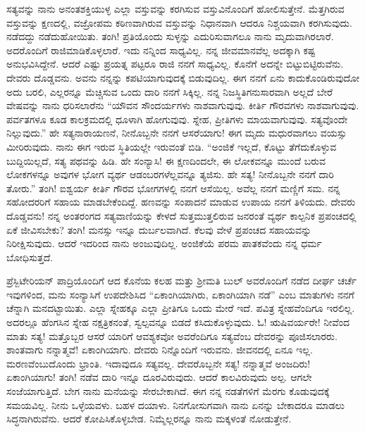 ಸತ್ಯವನ್ನು ನಾನು ಅನಂತಶಕ್ತಿಯುಳ್ಳ ಎಲ್ಲಾ ವಸ್ತುವನ್ನು ಕರಗಿಸುವ ವಸ್ತುವಿನೊಂದಿಗೆ ಹೋಲಿಸುತ್ತೇನೆ. ಮೆತ್ತಗಿರುವ ವಸ್ತುವನ್ನು ಕ್ಷಣದಲ್ಲಿ, ವಜ್ರೋಪಮ ಕಠಿಣವಾಗಿರುವ ವಸ್ತುವನ್ನು ನಿಧಾನವಾಗಿ ಆದರೂ ನಿಶ್ಚಯವಾಗಿ ಕರಗಿಸುವುದು. ನಡೆದದ್ದು ನಡೆದುಹೋಯಿತು. ತಂಗಿ! ಪ್ರತಿಯೊಂದು ಸುಳ್ಳನ್ನು ಎದುರಿಸುವಾಗಲೂ ನಾನು ಮೃದುವಾಗಿರಲಾರೆ. ಅದರೊಂದಿಗೆ ರಾಜಿಮಾಡಿಕೊಳ್ಳಲಾರೆ. ಇದು ನನ್ನಿಂದ ಸಾಧ್ಯವಿಲ್ಲ. ನನ್ನ ಜೀವಮಾನವೆಲ್ಲ ಅದಕ್ಕಾಗಿ ಕಷ್ಟ ಅನುಭವಿಸಿದ್ದೇನೆ. ಆದರೆ ಎಷ್ಟು ಪ್ರಯತ್ನ ಪಟ್ಟರೂ ರಾಜಿ ನನಗೆ ಸಾಧ್ಯವಿಲ್ಲ. ಕೊನೆಗೆ ಅದನ್ನೇ ಬಿಟ್ಟುಬಿಟ್ಟಿರುವೆನು. ದೇವರು ದೊಡ್ಡವನು. ಅವನು ನನ್ನನ್ನು ಕಪಟಿಯಾಗುವುದಕ್ಕೆ ಬಿಡುವುದಿಲ್ಲ. ಈಗ ನನಗೆ ಏನು ಕಾದುಕೊಂಡಿರುವುದೋ ಅದು ಬರಲಿ, ಎಲ್ಲರನ್ನೂ ಮೆಚ್ಚಿಸುವ ಒಂದು ದಾರಿ ನನಗೆ ಸಿಕ್ಕಿಲ್ಲ. ನನ್ನ ನಿಜಸ್ಥಿತಿಗನುಸಾರವಾಗಿ ಅಲ್ಲದೆ ಬೇರೆ ವೇಷವನ್ನು ನಾನು ಧರಿಸಲಾರೆನು ``ಯೌವನ ಸೌಂದರ್ಯಗಳು ನಾಶವಾಗುವುವು. ಕೀರ್ತಿ ಗೌರವಗಳು ನಾಶವಾಗುವುವು. ಪರ್ವತಗಳೂ ಕೂಡ ಕಾಲಕ್ರಮದಲ್ಲಿ ಧೂಳಾಗಿ ಹೋಗುವುವು. ಸ್ನೇಹ, ಪ್ರೀತಿಗಳು ಮಾಯವಾಗುವುವು. ಸತ್ಯವೊಂದೇ ನಿಲ್ಲುವುದು.” ಹೇ ಸತ್ಯನಾರಾಯಣನೆ, ನೀನೊಬ್ಬನೇ ನನಗೆ ಆಸರೆಯಾಗು! ಈಗ ಮೃದು ಮಧುರವಾಗಲು ವಯಸ್ಸು ಮೀರಿರುವುದು. ನಾನು ಈಗ ಇರುವ ಸ್ಥಿತಿಯಲ್ಲೇ ಇರುವಂತೆ ಬಿಡಿ. “ಅಂಜಿಕೆ ಇಲ್ಲದೆ, ಕೊಟ್ಟು ತೆಗೆದುಕೊಳ್ಳುವ ಬುದ್ದಿಯಿಲ್ಲದೆ, ಸತ್ಯ ಪಥವನ್ನು ಹಿಡಿ. ಹೇ ಸಂನ್ಯಾಸಿ! ಈ ಕ್ಷಣದಿಂದಲೇ, ಈ ಲೋಕವನ್ನೂ ಮುಂದೆ ಬರುವ ಲೋಕಗಳನ್ನೂ ಅವುಗಳ ಭೋಗ ವ್ಯರ್ಥ ಆಡಂಬರಗಳೆಲ್ಲವನ್ನೂ ತ್ಯಜಿಸು. ಹೇ ಸತ್ಯ! ನೀನೊಬ್ಬನೇ ನನಗೆ ದಾರಿ ತೋರು.” ತಂಗಿ! ಐಶ್ವರ್ಯ ಕೀರ್ತಿ ಗೌರವ ಭೋಗಗಳಲ್ಲಿ ನನಗೆ ಆಸೆಯಿಲ್ಲ. ಅವೆಲ್ಲ ನನಗೆ ಮಣ್ಣಿಗೆ ಸಮ. ನನ್ನ ಸಹೋದರರಿಗೆ ಸಹಾಯ ಮಾಡಬೇಕೆಂದಿದ್ದೆ. ಹಣವನ್ನು ಸಂಪಾದನೆ ಮಾಡುವ ಉಪಾಯ ನನಗೆ ತಿಳಿಯದು. ದೇವರು ದೊಡ್ಡವನು! ನನ್ನ ಅಂತರಂಗದ ಸತ್ಯವಾಣಿಯನ್ನು ಕೇಳದೆ ಸುತ್ತಮುತ್ತಲಿರುವ ಜನರಂತೆ ವ್ಯರ್ಥ ಕಾಲ್ಪನಿಕ ಪ್ರಪಂಚದಲ್ಲಿ ಏಕೆ ಜೀವಿಸಬೇಕು? ತಂಗಿ! ಮನಸ್ಸು ಇನ್ನೂ ದುರ್ಬಲವಾಗಿದೆ. ಕೆಲವು ವೇಳೆ ಪ್ರಪಂಚದ ಸಹಾಯವನ್ನು ನಿರೀಕ್ಷಿಸುವುದು. ಆದರೆ ಇದರಿಂದ ನಾನು ಅಂಜುವುದಿಲ್ಲ. ಅಂಜಿಕೆಯೆ ಪರಮ ಪಾತಕವೆಂದು ನನ್ನ ಧರ್ಮ ಬೋಧಿಸುತ್ತದೆ.

\vspace{0.1cm}

ಪ್ರೆಸ್ಬಿಟೇರಿಯನ್ ಪಾದ್ರಿಯೊಂದಿಗೆ ಆದ ಕೊನೆಯ ಕಲಹ ಮತ್ತು ಶ‍್ರೀಮತಿ ಬುಲ್ ಅವರೊಂದಿಗೆ ನಡೆದ ದೀರ್ಘ ಚರ್ಚೆ ಇವುಗಳಿಂದ, ಮನು ಸಂನ್ಯಾಸಿಗೆ ಉಪದೇಶಿಸಿದ “ಏಕಾಂಗಿಯಾಗಿರು, ಏಕಾಂಗಿಯಾಗಿ ನಡೆ” ಎಂಬ ಮಾತುಗಳು ನನಗೆ ಚೆನ್ನಾಗಿ ಮನದಟ್ಟಾಯಿತು. ಎಲ್ಲಾ ಸ್ನೇಹಕ್ಕೂ ಎಲ್ಲಾ ಪ್ರೀತಿಗೂ ಒಂದು ಮೇರೆ ಇದೆ. ಪವಿತ್ರ ಸ್ನೇಹವೆಂದಿಗೂ ಇರಲಿಲ್ಲ. ಅದರಲ್ಲೂ ಹೆಂಗಸಿನ ಸ್ನೇಹ ನಕ್ಷತ್ರಿಕನಂತೆ, ಸ್ವಲ್ಪವನ್ನೂ ಬಿಡದೆ ಕಸಿದುಕೊಳ್ಳುವುದು. ಓ! ಋಷಿವರ್ಯರೇ! ನೀವೆಂದ ಮಾತು ಸತ್ಯ! ಮತ್ತೊಬ್ಬರ ಆಸರೆ ಯಾರಿಗೆ ಆವಶ್ಯಕವೋ ಅವರೆಂದಿಗೂ ಸತ್ಯವೆಂಬ ದೇವರನ್ನು ಪೂಜಿಸಲಾರರು. ಶಾಂತವಾಗು ನನ್ನಾತ್ಮವೆ! ಏಕಾಂಗಿಯಾಗು. ದೇವರು ನಿನ್ನೊಂದಿಗೆ ಇರುವನು. ಜೀವನದಲ್ಲಿ ಏನೂ ಇಲ್ಲ. ಮರಣವೆಂಬುದೊಂದು ಭ್ರಾಂತಿ. ಇದಾವುದೂ ಸತ್ಯವಲ್ಲ. ದೇವರೊಬ್ಬನೇ ಸತ್ಯ! ನನ್ನಾತ್ಮವೆ ಅಂಜದಿರು! ಏಕಾಂಗಿಯಾಗು! ತಂಗಿ! ನಡೆವ ದಾರಿ ಇನ್ನೂ ದೂರವಿರುವುದು. ಆದರೆ ಕಾಲವಿರುವುದು ಅಲ್ಪ. ಆಗಲೇ ಸಂಜೆಯಾಗುತ್ತಿದೆ. ಬೇಗ ನಾನು ಮನೆಯನ್ನು ಸೇರಬೇಕಾಗಿದೆ. ಈಗ ನನ್ನ ನಡತೆಗಳಿಗೆ ಮೆರಗು ಕೊಡುವುದಕ್ಕೆ ಸಮಯವಿಲ್ಲ. ನೀನು ಒಳ್ಳೆಯವಳು. ಬಹಳ ದಯಾಳು. ನಿನಗೋಸುಗವಾಗಿ ನಾನು ಏನನ್ನು ಬೇಕಾದರೂ ಮಾಡಲು ಸಿದ್ಧನಾಗಿರುವೆನು. ಆದರೆ ಕೋಪಿಸಿಕೊಳ್ಳಬೇಡ. ನಿಮ್ಮೆಲ್ಲರನ್ನೂ ನಾನು ಮಕ್ಕಳಂತೆ ನೋಡುತ್ತೇನೆ.

